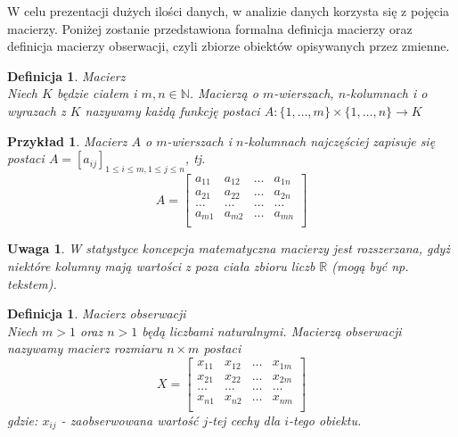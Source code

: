 \documentclass[12pt,a4paper]{report}
\newtheorem{definition}[theorem]{Definicja}
\newtheorem{uwaga}{Uwaga}
\newtheorem{example}{Przykład}
\begin{document}
W celu prezentacji dużych ilości danych, w analizie danych korzysta się z pojęcia macierzy. Poniżej zostanie przedstawiona formalna definicja macierzy oraz definicja macierzy obserwacji, czyli zbiorze obiektów opisywanych przez zmienne. %

\begin{definition}{Macierz \cite[Rozdział 1]{banaszak2002}}\\
Niech $K$ będzie ciałem i $m, n \in \mathbb{N}$. Macierzą o $m$-wierszach, $n$-kolumnach i o wyrazach z $K$ nazywamy każdą funkcję postaci
$A: \{1,\ldots, m \} \times \{1, \ldots, n\} \rightarrow K$
\end{definition}

\begin{example}
Macierz $A$ o $m$-wierszach i $n$-kolumnach najczęściej zapisuje się postaci $A=[a_{ij}]_{1\leq i \leq m,  1\leq j\leq n}$, tj. 
$$
A= \begin{bmatrix}
a_{11} & a_{12} & \ldots & a_{1n} \\
a_{21} & a_{22} & \ldots & a_{2n}\\ 
\ldots & \ldots & \ldots & \ldots\\
a_{m1} & a_{m2} & \ldots & a_{mn} \\
\end{bmatrix}    
$$
\end{example}

\begin{uwaga}
W statystyce koncepcja matematyczna macierzy jest rozszerzana, gdyż niektóre kolumny mają wartości z poza ciała zbioru liczb $\mathbb{R}$ (mogą być np. tekstem).
\end{uwaga}

\begin{definition}{Macierz obserwacji \cite[Rozdział 2]{mlodak2006}}\\
Niech $m>1$ oraz $n>1$ będą liczbami naturalnymi.  Macierzą obserwacji nazywamy macierz rozmiaru  $n \times m$  postaci
$$
X= \begin{bmatrix}
x_{11} & x_{12} & \ldots & x_{1m} \\
x_{21} & x_{22} & \ldots & x_{2m}\\
\ldots & \ldots & \ldots & \ldots \\
x_{n1} & x_{n2} & \ldots & x_{nm}\\
\end{bmatrix}
$$
gdzie:
$x_{ij}$ - zaobserwowana wartość $j$-tej cechy dla $i$-tego obiektu.
\end{definition}
\end{document}
